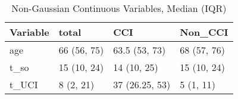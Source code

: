 \begin{table}

\caption{Non-Gaussian Continuous Variables, Median (IQR)}
\centering
\begin{tabular}[t]{l|l|l|l}
\hline
Variable & total & CCI & Non\_CCI\\
\hline
age & 66 (56, 75) & 63.5 (53, 73) & 68 (57, 76)\\
\hline
t\_so & 15 (10, 24) & 14 (10, 25) & 15 (10, 24)\\
\hline
t\_UCI & 8 (2, 21) & 37 (26.25, 53) & 5 (1, 11)\\
\hline
\end{tabular}
\end{table}
